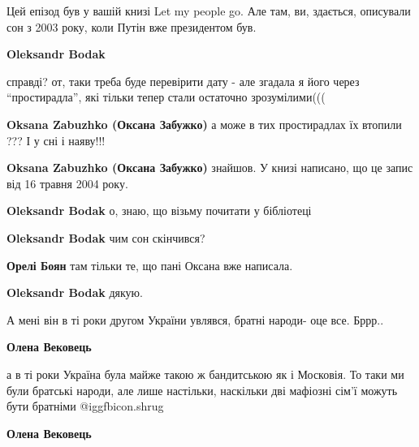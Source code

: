  
 
 
 
 
\zzSecCmt

\begin{itemize} %

Цей епізод був у вашій книзі Let my people go. Але там, ви, здається, описували
сон з 2003 року, коли Путін вже президентом був.

\begin{itemize} %
\textbf{Oleksandr Bodak} 

справді? от, таки треба буде перевірити дату - але згадала я його через
\enquote{простирадла}, які тільки тепер стали остаточно зрозумілими(((

\textbf{Oksana Zabuzhko (Оксана Забужко)} а може в тих простирадлах їх втопили ??? І у сні і наяву!!!

\textbf{Oksana Zabuzhko (Оксана Забужко)} знайшов. У книзі написано, що це запис від 16 травня 2004 року.

\begin{itemize} %
\textbf{Oleksandr Bodak} о, знаю, що візьму почитати у бібліотеці

\textbf{Oleksandr Bodak} чим сон скінчився?

\textbf{Орелі Боян} там тільки те, що пані Оксана вже написала.

\textbf{Oleksandr Bodak} дякую.
\end{itemize} %

А мені він в ті роки другом України увлявся, братні народи- оце все. Бррр..

\begin{itemize} %
\textbf{Олена Вековець} 

а в ті роки Україна була майже такою ж бандитською як і Московія. То таки ми
були братські народи, але лише настільки, наскільки дві мафіозні сім'ї можуть
бути братніми  @igg{fbicon.shrug} 

\textbf{Олена Вековець} 


\end{itemize}
\end{itemize}
\end{itemize}
